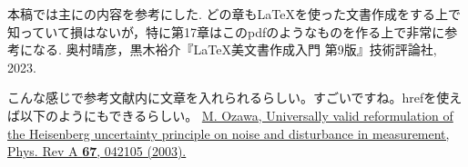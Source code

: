 

\let\oldaddcontentsline\addcontentsline %
\renewcommand{\addcontentsline}[3]{} %
\begin{thebibliography}{99}
\item[]本稿では主に\cite{bibunsho}の内容を参考にした. 
どの章も\LaTeX を使った文書作成をする上で知っていて損はないが，特に第17章はこのpdfのようなものを作る上で非常に参考になる. 
奥村晴彦，黒木裕介『\LaTeX 美文書作成入門 第9版』技術評論社, 2023.
\item[] こんな感じで参考文献内に文章を入れられるらしい。すごいですね。hrefを使えば以下のようにもできるらしい。
\href{https://journals.aps.org/pra/abstract/10.1103/PhysRevA.67.042105}{M. Ozawa, Universally valid reformulation of the Heisenberg uncertainty principle on noise and  disturbance in measurement, Phys. Rev A \textbf{67}, 042105 (2003).}
\end{thebibliography}
\let\addcontentsline\oldaddcontentsline %